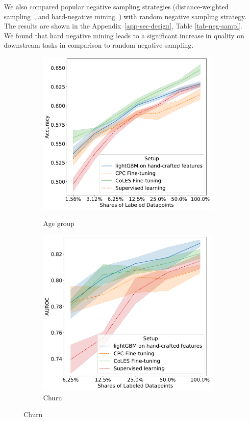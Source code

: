 \documentclass[sigconf]{acmart}
\begin{document}
We also compared popular negative sampling strategies (distance-weighted sampling~\citep{Manmatha2017SamplingMI}, and hard-negative mining~\citep{Schroff2015FaceNetAU}) with random negative sampling strategy. The results are shown in the Appendix~\ref{app-sec-design}, Table \ref{tab-neg-sampl}. We found that hard negative mining leads to a significant increase in quality on downstream tasks in comparison to random negative sampling.

\begin{figure}
  \centering
  \begin{subfigure}{0.25\linewidth}
    \caption{Age group}
    \includegraphics[width=\linewidth]{figures/ss_age_pred_per.pdf}
    \label{fig-semi-age2}
  \end{subfigure}%
  \begin{subfigure}{0.25\linewidth}
    \caption{Churn}
    \includegraphics[width=\linewidth]{figures/ss_rosbank_per.pdf}

\end{subfigure}
\end{figure}
\end{document}
